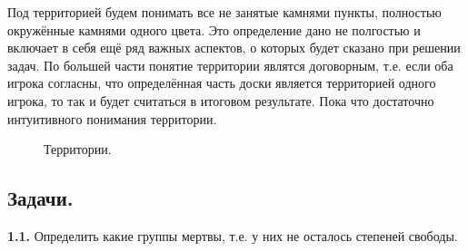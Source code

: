 \documentclass[14pt,a4paper]{extarticle}
\newcommand{\stone}[3]{\filldraw[color=black, fill=#3, very thick](#1,#2) circle(0.45);}
\newcommand{\territory}[3]{\filldraw[color=black, fill=#3, very thick](#1, #2) circle(0.125);}
\begin{document}
Под территорией будем понимать все не занятые камнями пункты, полностью окружённые камнями одного цвета. Это определение дано не полгостью и включает в себя ещё ряд важных аспектов, о которых будет сказано при решении задач. По большей части понятие территории являтся договорным, т.е. если оба игрока согласны, что определённая часть доски является территорией одного игрока, то так и будет считаться в итоговом результате. Пока что достаточно интуитивного понимания территории.

\begin{figure}[h]
\centering
{}
\caption{Территории.}
\label{10}
\end{figure}


\newpage


\subsection*{Задачи.}


\noindent\textbf{1.1.}
Определить какие группы мертвы, т.е. у них не осталось степеней свободы.
\end{document}
